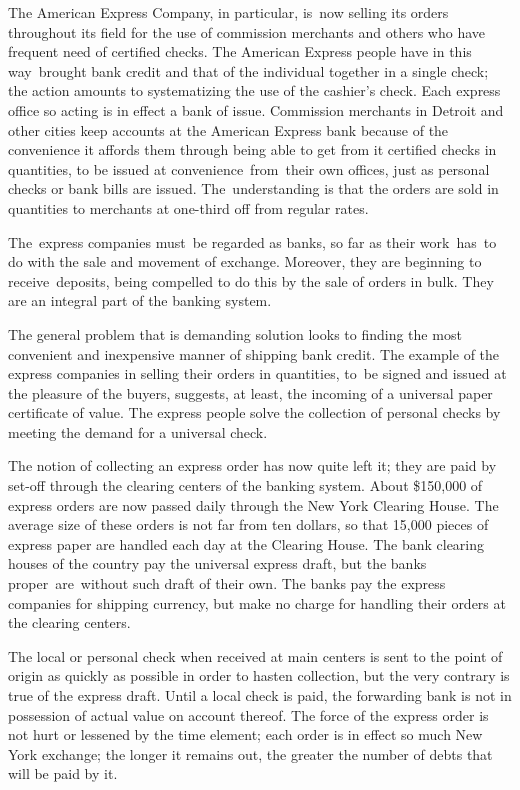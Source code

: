 \documentclass[openany,nobib]{tufte-book}
\begin{document}
\pagebreak The American Express Company, in particular, is~now selling its orders
throughout its field for the use of commission merchants and others who
have frequent need of certified checks. The American Express people have
in this way~brought bank credit and that of the individual together in a
single check; the action amounts to systematizing the use of the
cashier's check. Each express office so acting is in effect a bank of
issue. Commission merchants in Detroit and other cities keep accounts at
the American Express bank because of the convenience it affords them
through being able to get from it certified checks in quantities, to be
issued at convenience~from~their own offices, just as personal checks or
bank bills are issued. The~understanding is that the orders are sold in
quantities to merchants at one-third off from regular rates.~

The~express companies must~be regarded as banks, so far as their
work~has~to do with the sale and movement of exchange. Moreover, they
are beginning to receive~deposits, being compelled to do this by the
sale of orders in bulk. They are an integral part of the banking
system.~

The general problem that is demanding solution looks to finding the most
convenient and inexpensive manner of shipping bank credit. The example
of the express companies in selling their orders in quantities, to~be
signed and issued at the pleasure of the buyers, suggests, at least, the
incoming of a universal paper certificate of value. The express people
solve the collection of personal checks by meeting the demand for a
universal check.~

The notion of collecting an express order has now quite left it; they
are paid by set-off through the clearing centers of the banking system.
About \$150,000 of express orders are now passed daily through the New
York Clearing House. The average size of these orders is not far from
ten dollars, so that 15,000 pieces of express paper are handled each day
at the Clearing House. The bank clearing houses of the country pay the
universal express draft, but the banks proper~are~without such draft of
their own. The banks pay the express companies for shipping currency,
but make no charge for handling their orders at the clearing centers.~

The local or personal check when received at main centers is sent to the
point of origin as quickly as possible in order to hasten collection,
but the very contrary is true of the express draft. Until a local check
is paid, the forwarding bank is not in possession of actual value on
account thereof. The force of the express order is not hurt or lessened
by the time element; each order is in effect so much New York exchange;
the longer it remains out, the greater the number of debts that will be
paid by it. ~
\end{document}

